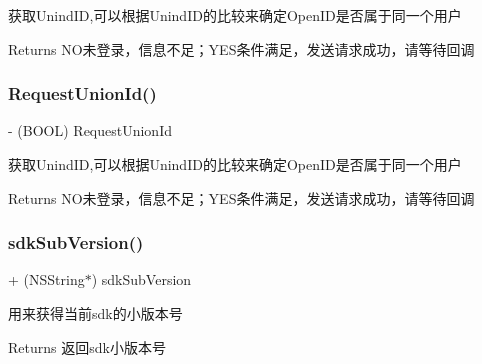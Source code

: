获取\+Unind\+ID,可以根据\+Unind\+I\+D的比较来确定\+Open\+I\+D是否属于同一个用户 \begin{DoxyReturn}{Returns}
N\+O未登录，信息不足；\+Y\+E\+S条件满足，发送请求成功，请等待回调 
\end{DoxyReturn}
\mbox{\label{interface_tencent_o_auth_a8161f0a4e6a3398ecae478e515915e3a}} 
\subsubsection{\texorpdfstring{Request\+Union\+Id()}{RequestUnionId()}\hspace{0.1cm}{\footnotesize\ttfamily [2/2]}}
{\footnotesize\ttfamily -\/ (B\+O\+OL) Request\+Union\+Id \begin{DoxyParamCaption}{ }\end{DoxyParamCaption}}

获取\+Unind\+ID,可以根据\+Unind\+I\+D的比较来确定\+Open\+I\+D是否属于同一个用户 \begin{DoxyReturn}{Returns}
N\+O未登录，信息不足；\+Y\+E\+S条件满足，发送请求成功，请等待回调 
\end{DoxyReturn}
\mbox{\label{interface_tencent_o_auth_afaf66587ebebdff3de626fb5c77d9d2d}} 
\subsubsection{\texorpdfstring{sdk\+Sub\+Version()}{sdkSubVersion()}\hspace{0.1cm}{\footnotesize\ttfamily [1/2]}}
{\footnotesize\ttfamily + (N\+S\+String$\ast$) sdk\+Sub\+Version \begin{DoxyParamCaption}{ }\end{DoxyParamCaption}}

用来获得当前sdk的小版本号 \begin{DoxyReturn}{Returns}
返回sdk小版本号 
\end{DoxyReturn}
\mbox{\label{interface_tencent_o_auth_afaf66587ebebdff3de626fb5c77d9d2d}} 

